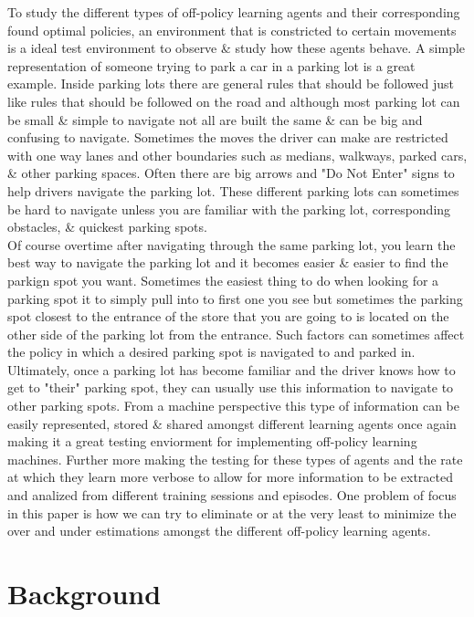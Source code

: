 \documentclass[letterpaper]{article}
\begin{document}
To study the different types of off-policy learning agents and their corresponding found optimal policies, an environment that is constricted to certain movements is a ideal test environment to observe \& study how these agents behave.  A simple representation of someone trying to park a car in a parking lot is a great example. Inside parking lots there are general rules that should be followed just like rules that should be followed on the road and although most parking lot can be small \& simple to navigate not all are built the same \& can be big and confusing to navigate.   Sometimes the moves the driver can make are restricted with one way lanes and other boundaries such as medians, walkways, parked cars, \& other parking spaces. Often there are big arrows and "Do Not Enter" signs to help drivers navigate the parking lot.  These different parking lots can sometimes be hard to navigate unless you are familiar with the parking lot, corresponding obstacles, \& quickest parking spots.\\
\indent Of course overtime after navigating through the same parking lot, you learn the best way to navigate the parking lot and it becomes easier \& easier to find the parkign spot you want. Sometimes the easiest thing to do when looking for a parking spot it to simply pull into to first one you see but sometimes the parking spot closest to the entrance of the store that you are going to is located on the other side of the parking lot from the entrance.  Such factors can sometimes affect the policy in which a desired parking spot is navigated to and parked in.  Ultimately, once a parking lot has become familiar and the driver knows how to get to "their" parking spot, they can usually use this information to navigate to other parking spots.  From a machine perspective this type of information can be easily represented, stored \& shared amongst different learning agents once again making it a great testing enviorment for implementing off-policy learning machines.  Further more making the testing for these types of agents and the rate at which they learn more verbose to allow for more information to be extracted and analized from different training sessions and episodes.  One problem of focus in this paper is how we can try to eliminate or at the very least to minimize the over and under estimations amongst the different off-policy learning agents.

\section{Background}
\end{document}

